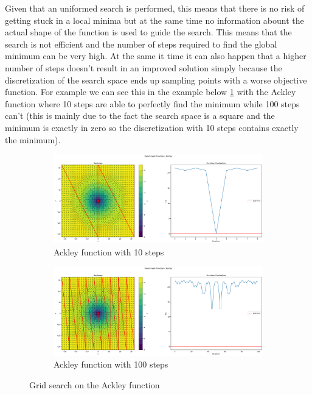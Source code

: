 Given that an uniformed search is performed, this means that there is no risk of getting stuck in a local minima but at the same time no information abount the actual shape of the function is used to guide the search. This means that the search is not efficient and the number of steps required to find the global minimum can be very high. At the same it time it can also happen that a higher number of steps doesn't result in an improved solution simply because the discretization of the search space ends up sampling points with a worse objective function. For example we can see this in the example below \ref{fig:gs-ackley} with the Ackley function where 10 steps are able to perfectly find the minimum while 100 steps can't (this is mainly due to the fact the search space is a square and the minimum is exactly in zero so the discretization with 10 steps contains exactly the minimum).

\begin{figure}[H]
    \begin{subfigure}{0.5\textwidth}
        \includegraphics[width=\textwidth]{lab1/imgs/gs_ackley_10.png}
        \caption{Ackley function with 10 steps}
    \end{subfigure}
    \begin{subfigure}{0.5\textwidth}
        \includegraphics[width=\textwidth]{lab1/imgs/gs_ackley_100.png}
        \caption{Ackley function with 100 steps}
    \end{subfigure}
    \caption{Grid search on the Ackley function}
    \label{fig:gs-ackley}
\end{figure}


